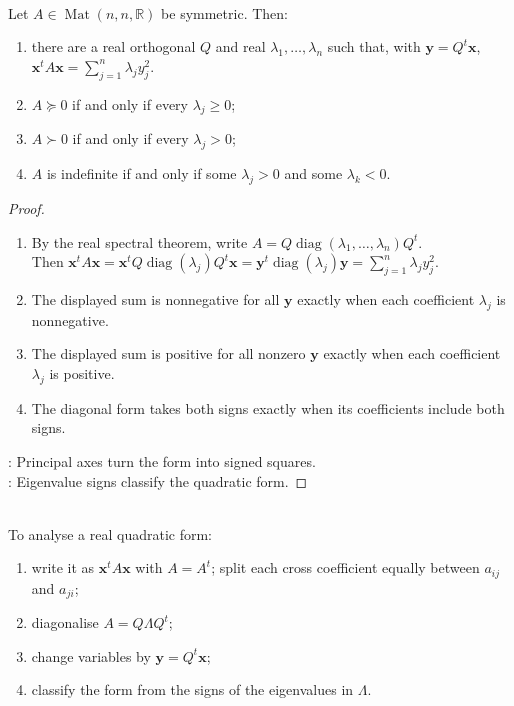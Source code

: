 \begin{theorem} \label{thm:real-quadratic-form-principal-axes} \\
Let $A\in\operatorname{Mat}(n,n,\mathbb{R})$ be symmetric. Then:
\begin{enumerate}[label=(\roman*)]
\setlength{\itemsep}{0pt}
\item there are a real orthogonal $Q$ and real $\lambda_1,\ldots,\lambda_n$ such that, with $\mathbf{y}=Q^t\mathbf{x}$, $\mathbf{x}^tA\mathbf{x}=\sum\limits_{j=1}^{n}\lambda_jy_j^2$.
\item $A\succeq0$ if and only if every $\lambda_j\geq0$;
\item $A\succ0$ if and only if every $\lambda_j>0$;
\item $A$ is indefinite if and only if some $\lambda_j>0$ and some $\lambda_k<0$.
\end{enumerate}
\begin{proof}
\begin{enumerate}[label=(\roman*)]
\setlength{\itemsep}{0pt}
\item By the real spectral theorem, write $A=Q\operatorname{diag}(\lambda_1,\ldots,\lambda_n)Q^t$.\\
Then $\mathbf{x}^tA\mathbf{x} =\mathbf{x}^tQ\operatorname{diag}(\lambda_j)Q^t\mathbf{x} =\mathbf{y}^t\operatorname{diag}(\lambda_j)\mathbf{y} =\sum\limits_{j=1}^{n}\lambda_jy_j^2$.
\item The displayed sum is nonnegative for all $\mathbf{y}$ exactly when each coefficient $\lambda_j$ is nonnegative.
\item The displayed sum is positive for all nonzero $\mathbf{y}$ exactly when each coefficient $\lambda_j$ is positive.
\item The diagonal form takes both signs exactly when its coefficients include both signs.
\end{enumerate}
: Principal axes turn the form into signed squares.\\
: Eigenvalue signs classify the quadratic form.
\end{proof}
\end{theorem}

\begin{method} \label{meth:quadratic-form-principal-axes} \\
To analyse a real quadratic form:
\begin{enumerate}[label=(\roman*)]
\setlength{\itemsep}{0pt}
\item write it as $\mathbf{x}^tA\mathbf{x}$ with $A=A^t$; split each cross coefficient equally between $a_{ij}$ and $a_{ji}$;
\item diagonalise $A=Q\Lambda Q^t$;
\item change variables by $\mathbf{y}=Q^t\mathbf{x}$;
\item classify the form from the signs of the eigenvalues in $\Lambda$.
\end{enumerate}
\end{method}

